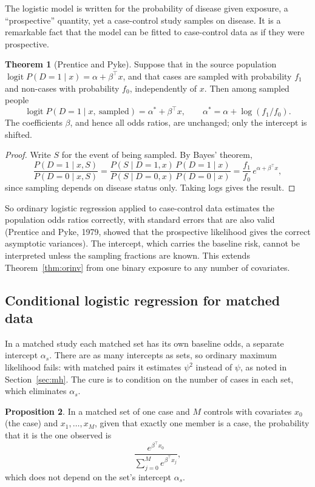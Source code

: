\documentclass[11pt,a4paper]{article}
\numberwithin{equation}{section}
\theoremstyle{definition}
\newtheorem{thm}{Theorem}[subsection]
\newtheorem{prop}[thm]{Proposition}
\begin{document}
The logistic model is written for the probability of disease given exposure, a ``prospective'' quantity, yet a case-control study
samples on disease. It is a remarkable fact that the model can be fitted to case-control data as if they were prospective.

\begin{thm}[Prentice and Pyke]
\label{thm:prentice}
Suppose that in the source population $\operatorname{logit} P(D = 1 \mid x) = \alpha + \beta^\top x$, and that cases are sampled with probability $f_1$ and non-cases with probability
$f_0$, independently of $x$. Then among sampled people
\[
\operatorname{logit} P(D = 1 \mid x,\ \text{sampled}) = \alpha^* + \beta^\top x, \qquad \alpha^* = \alpha + \log(f_1/f_0) .
\]
The coefficients $\beta$, and hence all odds ratios, are unchanged; only the intercept is shifted.
\end{thm}

\begin{proof}
Write $S$ for the event of being sampled. By Bayes' theorem,
\[
\frac{P(D = 1 \mid x, S)}{P(D = 0 \mid x, S)} = \frac{P(S \mid D = 1, x)\,P(D = 1 \mid x)}{P(S \mid D = 0, x)\,P(D = 0 \mid x)} = \frac{f_1}{f_0}\,e^{\alpha + \beta^\top x} ,
\]
since sampling depends on disease status only. Taking logs gives the result.
\end{proof}

So ordinary logistic regression applied to case-control data estimates the population odds ratios correctly, with standard errors
that are also valid (Prentice and Pyke, 1979, showed that the prospective likelihood gives the correct asymptotic variances). The
intercept, which carries the baseline risk, cannot be interpreted unless the sampling fractions are known. This extends
Theorem~\ref{thm:orinv} from one binary exposure to any number of covariates.

\subsection{Conditional logistic regression for matched data}

In a matched study each matched set has its own baseline odds, a separate intercept $\alpha_s$. There are as many intercepts as sets, so
ordinary maximum likelihood fails: with matched pairs it estimates $\psi^2$ instead of $\psi$, as noted in Section~\ref{sec:mh}. The cure is to
condition on the number of cases in each set, which eliminates $\alpha_s$.

\begin{prop}
\label{prop:clogit}
In a matched set of one case and $M$ controls with covariates $x_0$ (the case) and $x_1, \dots, x_M$, given that exactly one member is a case, the
probability that it is the one observed is
\[
\frac{e^{\beta^\top x_0}}{\sum_{j=0}^{M} e^{\beta^\top x_j}} ,
\]
which does not depend on the set's intercept $\alpha_s$.
\end{prop}
\end{document}
